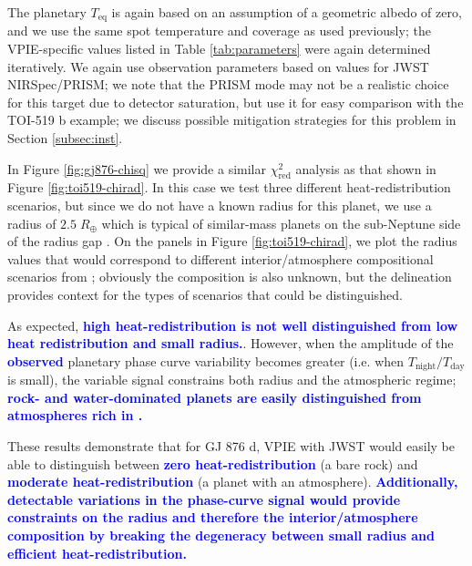 \documentclass[twocolumn,linenumbers]{aastex7}
\newcommand{\update}[1]{\textcolor{blue}{\bf #1}}
\begin{document}
The planetary $T_\mathrm{eq}$ is again based on an assumption of a geometric albedo of zero, and we use the same spot temperature and coverage as used previously; the VPIE-specific values listed in Table \ref{tab:parameters} were again determined iteratively. We again use observation parameters based on values for JWST NIRSpec/PRISM; we note that the PRISM mode may not be a realistic choice for this target due to detector saturation, but use it for easy comparison with the TOI-519 b example; we discuss possible mitigation strategies for this problem in Section \ref{subsec:inst}.


In Figure \ref{fig:gj876-chisq} we provide a similar $\chi^2_\mathrm{red}$ analysis as that shown in Figure \ref{fig:toi519-chirad}. In this case we test three different heat-redistribution scenarios, but since we do not have a known radius for this planet, we use a radius of $2.5\;R_\oplus$ which is typical of similar-mass planets on the sub-Neptune side of the radius gap \citep[e.g.,][]{zeng2019}. On the panels in Figure \ref{fig:toi519-chirad}, we plot the radius values that would correspond to different interior/atmosphere compositional scenarios from \citet{zeng2019}; obviously the composition is also unknown, but the delineation provides context for the types of scenarios that could be distinguished.

As expected, \update{high heat-redistribution is not well distinguished from low heat redistribution and small radius.}. However, when the amplitude of the \update{observed} planetary phase curve variability becomes greater (i.e. when $T_\mathrm{night}/T_\mathrm{day}$ is small), the variable signal constrains both radius and the atmospheric regime; \update{rock- and water-dominated planets are easily distinguished from atmospheres rich in \ce{H2}.} 

These results demonstrate that for GJ 876 d, VPIE with JWST would easily be able to distinguish between \update{zero heat-redistribution} (a bare rock) and \update{moderate heat-redistribution} (a planet with an atmosphere). \update{Additionally, detectable variations in the phase-curve signal would provide constraints on the radius and therefore the interior/atmosphere composition by breaking the degeneracy between small radius and efficient heat-redistribution.}
\end{document}
